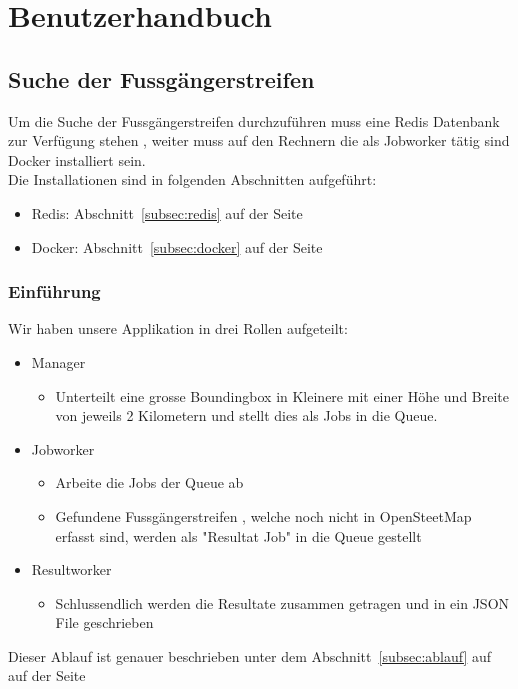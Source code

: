 \section{Benutzerhandbuch}
\subsection{Suche der Fussgängerstreifen}
Um die Suche der Fussgängerstreifen durchzuführen muss eine Redis Datenbank zur Verfügung stehen , weiter muss auf den Rechnern die als Jobworker tätig sind Docker installiert sein. \\
Die Installationen sind in folgenden Abschnitten aufgeführt:
\begin{itemize}
	\item Redis:  Abschnitt~\ref{subsec:redis} auf der Seite~\pageref{subsec:redis}
	\item Docker: Abschnitt~\ref{subsec:docker} auf der Seite~\pageref{subsec:docker}
\end{itemize}

\subsubsection{Einführung}
Wir haben unsere Applikation in drei Rollen aufgeteilt:
\begin{itemize}
	\item Manager
	\begin{itemize}
		\item Unterteilt eine grosse Boundingbox in Kleinere mit einer Höhe und Breite von jeweils 2 Kilometern und stellt dies als Jobs in die Queue.
	\end{itemize}
	\item Jobworker
	\begin{itemize}
		\item Arbeite die Jobs der Queue ab
		\item Gefundene Fussgängerstreifen , welche noch nicht in OpenSteetMap erfasst sind, werden als "Resultat Job" in die Queue gestellt
	\end{itemize}
	\item Resultworker
	\begin{itemize}
		\item Schlussendlich werden die Resultate zusammen getragen und in ein JSON File geschrieben
	\end{itemize}
\end{itemize}

Dieser Ablauf ist genauer beschrieben unter dem Abschnitt~\ref{subsec:ablauf} auf   auf der Seite~\pageref{subsec:ablauf}
\newpage
